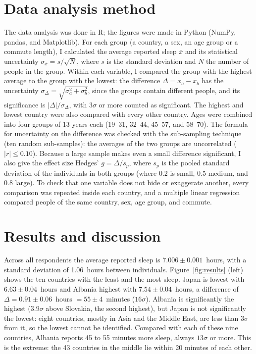 \documentclass{article}
\begin{document}
\section*{Data analysis method}
The data analysis was done in R; the figures were made in Python (NumPy, pandas, and Matplotlib). For each group (a country, a sex, an age group or a commute length), I calculated the average reported sleep $\bar{x}$ and its statistical uncertainty $\sigma_{\bar{x}} = s/\sqrt{N}$, where $s$ is the standard deviation and $N$ the number of people in the group. Within each variable, I compared the group with the highest average to the group with the lowest: the difference $\Delta = \bar{x}_a - \bar{x}_b$ has the uncertainty $\sigma_{\Delta} = \sqrt{\sigma_{a}^{2} + \sigma_{b}^{2}}$, since the groups contain different people, and its significance is $|\Delta|/\sigma_{\Delta}$, with $3\sigma$ or more counted as significant. The highest and lowest country were also compared with every other country. Ages were combined into four groups of 13 years each (19--31, 32--44, 45--57, and 58--70). The formula for uncertainty on the difference was checked with the sub-sampling technique (ten random sub-samples): the averages of the two groups are uncorrelated ($|r| \leq 0.10$). Because a large sample makes even a small difference significant, I also give the effect size Hedges' $g = \Delta / s_p$, where $s_p$ is the pooled standard deviation of the individuals in both groups (where 0.2 is small, 0.5 medium, and 0.8 large). To check that one variable does not hide or exaggerate another, every comparison was repeated inside each country, and a multiple linear regression compared people of the same country, sex, age group, and commute. 

\section*{Results and discussion}
Across all respondents the average reported sleep is $7.006 \pm 0.001$~hours, with a standard deviation of 1.06~hours between individuals. Figure~\ref{fig:results} (left) shows the ten countries with the least and the most sleep. Japan is lowest with $6.63 \pm 0.04$~hours and Albania highest with $7.54 \pm 0.04$~hours, a difference of $\Delta = 0.91 \pm 0.06$~hours $=55 \pm 4$~minutes ($16\sigma$). Albania is significantly the highest ($3.9\sigma$ above Slovakia, the second highest), but Japan is not significantly the lowest: eight countries, mostly in Asia and the Middle East, are less than $3\sigma$ from it, so the lowest cannot be identified. Compared with each of these nine countries, Albania reports 45 to 55 minutes more sleep, always $13\sigma$ or more. This is the extreme: the 43 countries in the middle lie within 20 minutes of each other.
\end{document}
